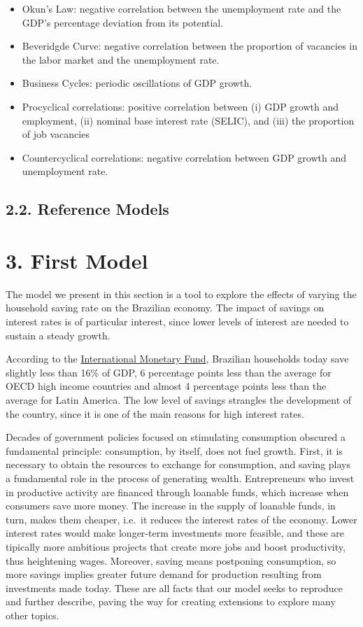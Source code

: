 \documentclass[11pt,]{article}
\begin{document}
\begin{itemize}
\item
  Okun's Law: negative correlation between the unemployment rate and the
  GDP's percentage deviation from its potential.
\item
  Beveridgde Curve: negative correlation between the proportion of
  vacancies in the labor market and the unemployment rate.
\item
  Business Cycles: periodic oscillations of GDP growth.
\item
  Procyclical correlations: positive correlation between (i) GDP growth
  and employment, (ii) nominal base interest rate (SELIC), and (iii) the
  proportion of job vacancies
\item
  Countercyclical correlations: negative correlation between GDP growth
  and unemployment rate.
\end{itemize}

\subsection{2.2. Reference Models}\label{reference-models}

\section{3. First Model}\label{first-model}

The model we present in this section is a tool to explore the effects of
varying the household saving rate on the Brazilian economy. The impact
of savings on interest rates is of particular interest, since lower
levels of interest are needed to sustain a steady growth.

According to the
\href{https://www.imf.org/external/pubs/ft/weo/2017/01/weodata/index.aspx}{International
Monetary Fund}, Brazilian households today save slightly less than 16\%
of GDP, 6 percentage points less than the average for OECD high income
countries and almost 4 percentage points less than the average for Latin
America. The low level of savings strangles the development of the
country, since it is one of the main reasons for high interest rates.

Decades of government policies focused on stimulating consumption
obscured a fundamental principle: consumption, by itself, does not fuel
growth. First, it is necessary to obtain the resources to exchange for
consumption, and saving plays a fundamental role in the process of
generating wealth. Entrepreneurs who invest in productive activity are
financed through loanable funds, which increase when consumers save more
money. The increase in the supply of loanable funds, in turn, makes them
cheaper, i.e.~it reduces the interest rates of the economy. Lower
interest rates would make longer-term investments more feasible, and
these are tipically more ambitious projects that create more jobs and
boost productivity, thus heightening wages. Moreover, saving means
postponing consumption, so more savings implies greater future demand
for production resulting from investments made today. These are all
facts that our model seeks to reproduce and further describe, paving the
way for creating extensions to explore many other topics.
\end{document}

